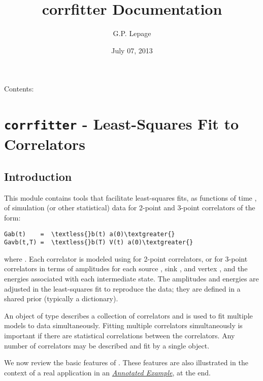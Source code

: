 \documentclass[letterpaper,10pt,english]{sphinxmanual}
\title{corrfitter Documentation}
\date{July 07, 2013}
\author{G.P. Lepage}
\begin{document}
\maketitle
\tableofcontents
{}\label{index::doc}


Contents:


\chapter{\texttt{corrfitter} - Least-Squares Fit to Correlators}
\label{corrfitter:corrfitter-documentation}\label{corrfitter::doc}\label{corrfitter:corrfitter-least-squares-fit-to-correlators}

\section{Introduction}
\label{corrfitter:introduction}
This module contains tools that facilitate least-squares fits, as functions
of time , of simulation (or other statistical) data for 2-point and
3-point correlators of the form:

\begin{Verbatim}[commandchars=\\\{\}]
Gab(t)    =  \textless{}b(t) a(0)\textgreater{}
Gavb(t,T) =  \textless{}b(T) V(t) a(0)\textgreater{}
\end{Verbatim}

where . Each correlator is modeled using {\hyperref[corrfitter:corrfitter.Corr2]{}} for 2-point
correlators, or {\hyperref[corrfitter:corrfitter.Corr3]{}} for 3-point correlators in terms of amplitudes for
each source , sink , and vertex , and the energies
associated with each intermediate state. The amplitudes and energies are
adjusted in the least-squares fit to reproduce the data; they are defined
in a shared prior (typically a dictionary).

An object of type {\hyperref[corrfitter:corrfitter.CorrFitter]{}} describes a collection of correlators and is
used to fit multiple models to data simultaneously. Fitting multiple
correlators simultaneously is important if there are statistical
correlations between the correlators. Any number of correlators may be
described and fit by a single {\hyperref[corrfitter:corrfitter.CorrFitter]{}} object.

We now review the basic features of . These features are also
illustrated in the context of a real application in an
{\hyperref[corrfitter:annotated-example]{\emph{Annotated Example}}}, at the end.
\end{document}
